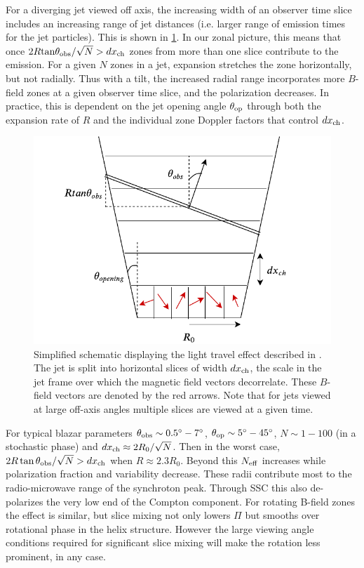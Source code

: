 For a diverging jet viewed off axis, the increasing width of an observer time slice includes an increasing range of jet distances (i.e. larger range of emission times for the jet particles). This is shown in \cref{fig:ssc6}. In our zonal picture, this means that once $2R {\rm tan}\theta_{\rm obs} / \sqrt{N} > dx_{\rm ch}$ zones from more than one slice contribute to the emission. For a given $N$ zones in a jet, expansion stretches the zone horizontally, but not radially. Thus with a tilt, the increased radial range incorporates more $B$-field zones at a given observer time slice, and the polarization decreases. 
In practice, this is dependent on the jet opening angle $\theta_{\rm op}$ through both the expansion rate of $R$ and the individual zone Doppler factors that control $dx_{\rm ch}$.

\begin{figure}[t]
\includegraphics[width=0.7\linewidth]{figures/Figure6.pdf}
\centering
\caption{Simplified schematic displaying the light travel effect described in . The jet is split into horizontal slices of width $dx_{\rm ch}$, the scale in the jet frame over which the magnetic field vectors decorrelate. These $B$-field vectors are denoted by the red arrows. Note that for jets viewed at large off-axis angles multiple slices are viewed at a given time.
}
\label{fig:ssc6}
\end{figure}

For typical blazar parameters $\theta_{\rm obs} \sim 0.5^{\circ} - 7^{\circ}$, $\theta_{\rm op} \sim 5^{\circ} - 45^{\circ}$, $N \sim 1 - 100$ (in a stochastic phase) and $dx_{\rm ch} \approx 2R_0/\sqrt{N}$. Then in the worst case, $2R\, {\rm tan}\,\theta_{\rm obs} / \sqrt{N} > dx_{\rm ch}$ when $R \approx 2.3R_0$. Beyond this $N_{\rm eff}$ increases while polarization fraction and variability decrease. These radii contribute most to the radio-microwave range of the synchroton peak. Through SSC this also de-polarizes the very low end of the Compton component. For rotating B-field zones the effect is similar, but slice mixing not only lowers $\Pi$ but smooths over rotational phase in the helix structure. However the large viewing angle conditions required for significant slice mixing will make the rotation less prominent, in any case.

